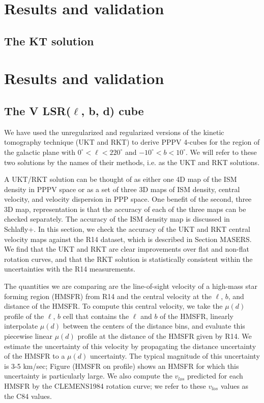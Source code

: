 \section{Results and validation}
\label{sec:results}
\subsection{The KT solution}
\section{Results and validation}
\label{sec:results}
\subsection{The V LSR($\ell$, b, d) cube}
We have used the unregularized and regularized versions of the kinetic tomography technique (UKT and RKT) to derive PPPV 4-cubes for the region of the galactic plane with $0^\circ < \ell < 220^\circ$ and $-10^\circ < b < 10^\circ$. We will refer to these two solutions by the names of their methods, i.e. as the UKT and RKT solutions. 

A UKT/RKT solution can be thought of as either one 4D map of the ISM density in PPPV space or as a set of three 3D maps of ISM density, central velocity, and velocity dispersion in PPP space. One benefit of the second, three 3D map, representation is that the accuracy of each of the three maps can be checked separately. The accuracy of the ISM density map is discussed in Schlafly+. In this section, we check the accuracy of the UKT and RKT central velocity maps against the R14 dataset, which is described in Section MASERS. We find that the UKT and RKT are clear improvements over flat and non-flat rotation curves, and that the RKT solution is statistically consistent within the uncertainties with the R14 measurements. 

The quantities we are comparing are the line-of-sight velocity of a high-mass star forming region (HMSFR) from R14 and the central velocity at the $\ell$, $b$, and distance of the HMSFR. To compute this central velocity, we take the $\mu(d)$ profile of the $\ell$, $b$ cell that contains the $\ell$ and $b$ of the HMSFR, linearly interpolate $\mu(d)$ between the centers of the distance bins, and evaluate this piecewise linear $\mu(d)$ profile at the distance of the HMSFR given by R14. We estimate the uncertainty of this velocity by propagating the distance uncertainty of the HMSFR to a $\mu(d)$ uncertainty. The typical magnitude of this uncertainty is 3-5 km/sec; Figure (HMSFR on profile) shows an HMSFR for which this uncertainty is particularly large. We also compute the $v_{los}$ predicted for each HMSFR by the CLEMENS1984 rotation curve; we refer to these $v_{los}$ values as the C84 values. 

